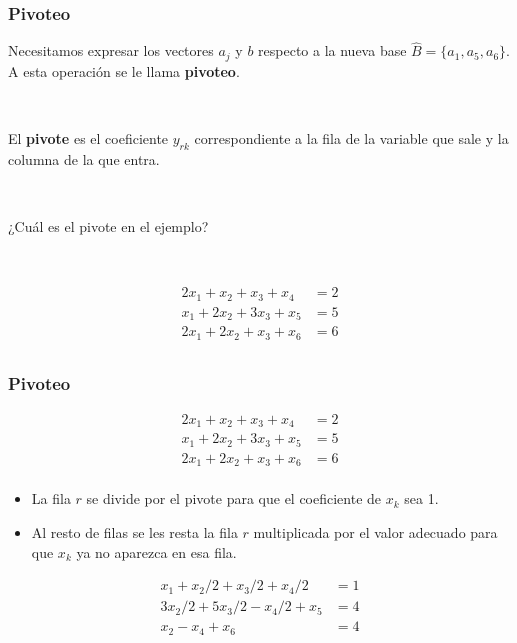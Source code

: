 \documentclass{beamer}
\begin{document}
\begin{frame}
\frametitle{Pivoteo}

Necesitamos expresar los vectores $a_j$ y $b$ respecto a la nueva base $\hat{B}=\{a_1,a_5,a_6\}$. A esta operación se le llama \textbf{pivoteo}.

\

El \textbf{pivote} es el coeficiente $y_{rk}$ correspondiente a la fila de la variable que sale y la columna de la que entra.

\

¿Cuál es el pivote en el ejemplo?

\

\begin{align*}
2x_1+x_2+x_3 + x_4 &= 2   \\
x_1 + 2x_2 + 3x_3 +  x_5 &= 5  \\
2x_1+2x_2+x_3 + x_6 &= 6 \\
\end{align*}





\end{frame}
\begin{frame}
\frametitle{Pivoteo}

\begin{align*}
2x_1+x_2+x_3 + x_4 &= 2   \\
x_1 + 2x_2 + 3x_3 +  x_5 &= 5  \\
2x_1+2x_2+x_3 + x_6 &= 6 \\
\end{align*}


\begin{itemize}
\item La fila $r$ se divide por el pivote para que el coeficiente de $x_k$ sea 1.
\item Al resto de filas se les resta la fila $r$  multiplicada por el valor adecuado para que $x_k$ ya no aparezca en esa fila.
\end{itemize}

\begin{align*}
x_1 + x_2/2 + x_3/2 + x_4/2 &= 1   \\
     3x_2/2 + 5x_3/2 - x_4/2 +  x_5 &= 4  \\
      x_2 - x_4 + x_6 &= 4 \\
\end{align*}

\end{frame}
\end{document}
